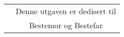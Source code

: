 \thispagestyle{empty}
\vspace*{\fill}


\begin{tabular}{p{10cm}c}
& {\scriptsize Denne utgaven er dedisert til} \\
& Bestemor og Bestefar \\
\end{tabular}

\vspace*{\fill}
\vspace*{\fill}

